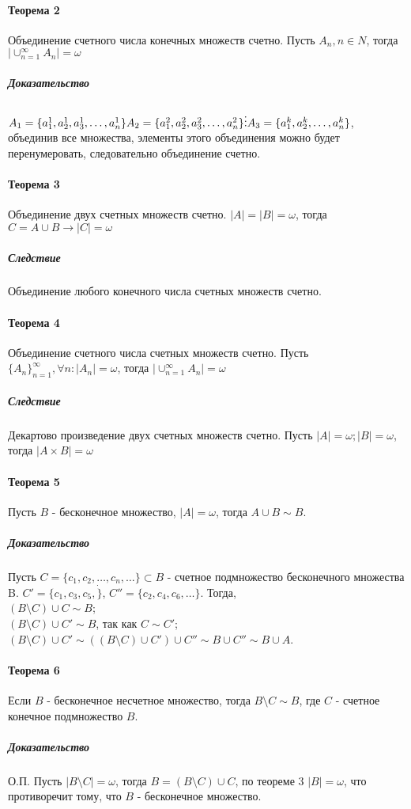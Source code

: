 \documentclass[10pt]{article}
\begin{document}
			\paragraph{Теорема 2} Объединение счетного числа конечных множеств счетно. Пусть $A_n, n \in N$, тогда $|\cup_{n=1}^{\infty} A_n| = \omega$
			\subparagraph{Доказательство}
			$A_1 = \{a_1^1, a_2^1, a_3^1, \dots, a_n^1\}\\
			 A_2 = \{a_1^2, a_2^2, a_3^2, \dots, a_n^2\}\\
			 \vdots 
			 A_3 = \{a_1^k, a_2^k, \dots, a_n^k\}$, объединив все множества, элементы этого объединения можно будет перенумеровать, следовательно объединение счетно.
			\paragraph{Теорема 3} Объединение двух счетных множеств счетно. $|A| = |B| = \omega$, тогда $C = A \cup B \to |C| = \omega$
			\subparagraph{Следствие} Объединение любого конечного числа счетных множеств счетно.
			\paragraph{Теорема 4} Объединение счетного числа счетных множеств счетно. Пусть $\{A_n\}_{n=1}^{\infty}, \forall n : |A_n| = \omega$, тогда $|\cup_{n=1}^{\infty} A_n| = \omega$
			\subparagraph{Следствие} Декартово произведение двух счетных множеств счетно. Пусть $|A| = \omega; |B| = \omega$, тогда $|A \times B| = \omega$
			\paragraph{Теорема 5} Пусть $B$ - бесконечное множество, $|A| = \omega$, тогда $A \cup B \sim B$.
			\subparagraph{Доказательство} Пусть $C = \{c_1, c_2, \dots, c_n, \dots\} \subset B$ - счетное подмножество бесконечного множества B. $C' = \{c_1, c_3, c_5, \dot\}$, $C'' = \{c_2, c_4, c_6, \dots\}$. Тогда, \\
			$(B\setminus C) \cup C \sim B$;\\
			$(B\setminus C) \cup C' \sim B$, так как $C \sim C'$;\\
			$(B\setminus C) \cup C' \sim ((B\setminus C) \cup C') \cup C'' \sim B \cup C'' \sim B \cup A$.
			\paragraph{Теорема 6} Если $B$ - бесконечное несчетное множество, тогда $B\setminus C \sim B$, где $C$ - счетное конечное подмножество $B$.
			\subparagraph{Доказательство} О.П.  Пусть $|B\setminus C| = \omega$, тогда $B = (B\setminus C)\cup C$, по теореме 3 $|B| = \omega$, что противоречит тому, что $B$ - бесконечное множество.
			
\end{document}
